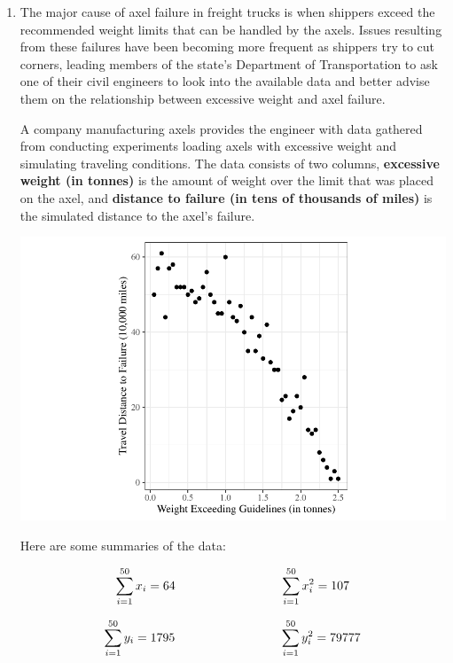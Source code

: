 \documentclass[11pt]{article}\usepackage[]{graphicx}\usepackage[]{color}
\begin{document}
\begin{enumerate}



\item
The major cause of axel failure in freight trucks is when shippers exceed the recommended weight limits that can be handled by the axels. 
Issues resulting from these failures have been becoming more frequent as shippers try to cut corners, 
leading members of the state's Department of Transportation to ask one of their civil engineers 
to look into the available data and better advise them on the relationship between excessive weight and axel failure.

A company manufacturing axels provides the engineer with data gathered from conducting experiments loading axels with excessive weight and simulating traveling conditions.
The data consists of two columns, \textbf{excessive weight (in tonnes)} is the amount of weight over the limit that was placed on the axel, and 
\textbf{distance to failure (in tens of thousands of miles)} is the simulated distance to the axel's failure. 


\begin{center}
\includegraphics{stat305-hw4-003}
\end{center}

Here are some summaries of the data:

$$
\sum_{i=1}^{50} x_i = 64 \hspace{3cm} \sum_{i=1}^{50} x_i^2 = 107 \\
$$

$$
\sum_{i=1}^{50} y_i = 1795 \hspace{3cm} \sum_{i=1}^{50} y_i^2 = 79777 \\
$$


\end{enumerate}
\end{document}
